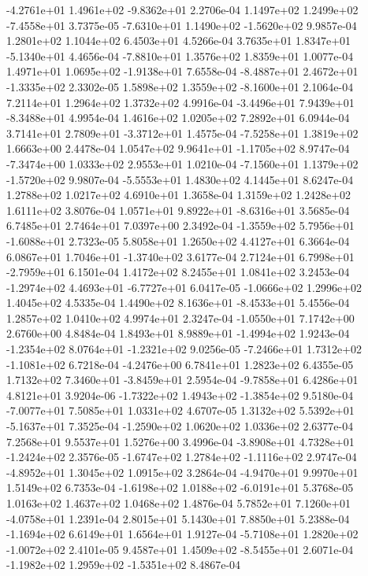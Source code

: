 -4.2761e+01  1.4961e+02 -9.8362e+01  2.2706e-04
 1.1497e+02  1.2499e+02 -7.4558e+01  3.7375e-05
-7.6310e+01  1.1490e+02 -1.5620e+02  9.9857e-04
1.2801e+02 1.1044e+02 6.4503e+01  4.5266e-04
 3.7635e+01  1.8347e+01 -5.1340e+01  4.4656e-04
-7.8810e+01  1.3576e+02  1.8359e+01  1.0077e-04
 1.4971e+01  1.0695e+02 -1.9138e+01  7.6558e-04
-8.4887e+01  2.4672e+01 -1.3335e+02  2.3302e-05
 1.5898e+02  1.3559e+02 -8.1600e+01  2.1064e-04
7.2114e+01 1.2964e+02 1.3732e+02  4.9916e-04
-3.4496e+01  7.9439e+01 -8.3488e+01  4.9954e-04
1.4616e+02 1.0205e+02 7.2892e+01  6.0944e-04
 3.7141e+01  2.7809e+01 -3.3712e+01  1.4575e-04
-7.5258e+01  1.3819e+02  1.6663e+00  2.4478e-04
 1.0547e+02  9.9641e+01 -1.1705e+02  8.9747e-04
-7.3474e+00  1.0333e+02  2.9553e+01  1.0210e-04
-7.1560e+01  1.1379e+02 -1.5720e+02  9.9807e-04
-5.5553e+01  1.4830e+02  4.1445e+01  8.6247e-04
1.2788e+02 1.0217e+02 4.6910e+01  1.3658e-04
1.3159e+02 1.2428e+02 1.6111e+02  3.8076e-04
 1.0571e+01  9.8922e+01 -8.6316e+01  3.5685e-04
6.7485e+01 2.7464e+01 7.0397e+00  2.3492e-04
-1.3559e+02  5.7956e+01 -1.6088e+01  2.7323e-05
5.8058e+01 1.2650e+02 4.4127e+01  6.3664e-04
 6.0867e+01  1.7046e+01 -1.3740e+02  3.6177e-04
 2.7124e+01  6.7998e+01 -2.7959e+01  6.1501e-04
1.4172e+02 8.2455e+01 1.0841e+02  3.2453e-04
-1.2974e+02  4.4693e+01 -6.7727e+01  6.0417e-05
-1.0666e+02  1.2996e+02  1.4045e+02  4.5335e-04
 1.4490e+02  8.1636e+01 -8.4533e+01  5.4556e-04
1.2857e+02 1.0410e+02 4.9974e+01  2.3247e-04
-1.0550e+01  7.1742e+00  2.6760e+00  4.8484e-04
 1.8493e+01  8.9889e+01 -1.4994e+02  1.9243e-04
-1.2354e+02  8.0764e+01 -1.2321e+02  9.0256e-05
-7.2466e+01  1.7312e+02 -1.1081e+02  6.7218e-04
-4.2476e+00  6.7841e+01  1.2823e+02  6.4355e-05
 1.7132e+02  7.3460e+01 -3.8459e+01  2.5954e-04
-9.7858e+01  6.4286e+01  4.8121e+01  3.9204e-06
-1.7322e+02  1.4943e+02 -1.3854e+02  9.5180e-04
-7.0077e+01  7.5085e+01  1.0331e+02  4.6707e-05
 1.3132e+02  5.5392e+01 -5.1637e+01  7.3525e-04
-1.2590e+02  1.0620e+02  1.0336e+02  2.6377e-04
7.2568e+01 9.5537e+01 1.5276e+00  3.4996e-04
-3.8908e+01  4.7328e+01 -1.2424e+02  2.3576e-05
-1.6747e+02  1.2784e+02 -1.1116e+02  2.9747e-04
-4.8952e+01  1.3045e+02  1.0915e+02  3.2864e-04
-4.9470e+01  9.9970e+01  1.5149e+02  6.7353e-04
-1.6198e+02  1.0188e+02 -6.0191e+01  5.3768e-05
1.0163e+02 1.4637e+02 1.0468e+02  1.4876e-04
 5.7852e+01  7.1260e+01 -4.0758e+01  1.2391e-04
2.8015e+01 5.1430e+01 7.8850e+01  5.2388e-04
-1.1694e+02  6.6149e+01  1.6564e+01  1.9127e-04
-5.7108e+01  1.2820e+02 -1.0072e+02  2.4101e-05
 9.4587e+01  1.4509e+02 -8.5455e+01  2.6071e-04
-1.1982e+02  1.2959e+02 -1.5351e+02  8.4867e-04

